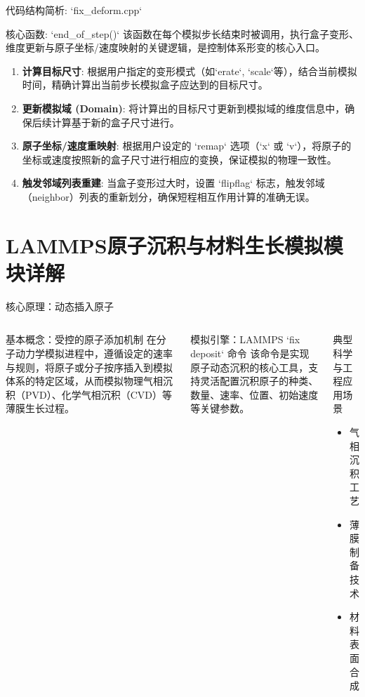 \documentclass{beamer}
\begin{document}
\begin{frame}{代码结构简析: `fix_deform.cpp`}
    \begin{block}{核心函数: `end_of_step()`}
        该函数在每个模拟步长结束时被调用，执行盒子变形、维度更新与原子坐标/速度映射的关键逻辑，是控制体系形变的核心入口。
    \end{block}
    \begin{enumerate}
        \item \textbf{计算目标尺寸}: 根据用户指定的变形模式（如`erate`, `scale`等），结合当前模拟时间，精确计算出当前步长模拟盒子应达到的目标尺寸。
        \item \textbf{更新模拟域 (Domain)}: 将计算出的目标尺寸更新到模拟域的维度信息中，确保后续计算基于新的盒子尺寸进行。
        \item \textbf{原子坐标/速度重映射}: 根据用户设定的 `remap` 选项（`x` 或 `v`），将原子的坐标或速度按照新的盒子尺寸进行相应的变换，保证模拟的物理一致性。
        \item \textbf{触发邻域列表重建}: 当盒子变形过大时，设置 `flipflag` 标志，触发邻域（neighbor）列表的重新划分，确保短程相互作用计算的准确无误。
    \end{enumerate}
\end{frame}

\section{LAMMPS原子沉积与材料生长模拟模块详解}

\begin{frame}{核心原理：动态插入原子}
    \begin{columns}
        \begin{block}{基本概念：受控的原子添加机制}
            在分子动力学模拟进程中，遵循设定的速率与规则，将原子或分子按序插入到模拟体系的特定区域，从而模拟物理气相沉积（PVD）、化学气相沉积（CVD）等薄膜生长过程。
        \end{block}
        \begin{block}{模拟引擎：LAMMPS `fix deposit` 命令}
            该命令是实现原子动态沉积的核心工具，支持灵活配置沉积原子的种类、数量、速率、位置、初始速度等关键参数。
        \end{block}
        \begin{block}{典型科学与工程应用场景}
            \begin{itemize}
                \item 气相沉积工艺
                \item 薄膜制备技术
                \item 材料表面合成
            \end{itemize}
        \end{block}
    \end{columns}
\end{frame}
\end{document}
